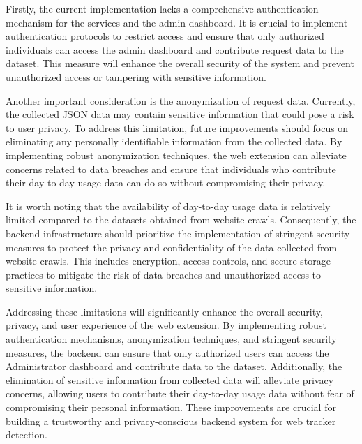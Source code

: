 Firstly, the current implementation lacks a comprehensive authentication mechanism for the services and the admin dashboard.
It is crucial to implement authentication protocols to restrict access and ensure that only authorized individuals can access
the admin dashboard and contribute request data to the dataset. This measure will enhance the overall security of the system
and prevent unauthorized access or tampering with sensitive information.

Another important consideration is the anonymization of request data. Currently, the collected JSON data may contain sensitive
information that could pose a risk to user privacy. To address this limitation, future improvements should focus on eliminating
any personally identifiable information from the collected data. By implementing robust anonymization techniques, the web extension
can alleviate concerns related to data breaches and ensure that individuals who contribute their day-to-day usage data can do so
without compromising their privacy.

It is worth noting that the availability of day-to-day usage data is relatively limited compared to the datasets obtained from website
crawls. Consequently, the backend infrastructure should prioritize the implementation of stringent security measures to protect the
privacy and confidentiality of the data collected from website crawls. This includes encryption, access controls, and secure storage
practices to mitigate the risk of data breaches and unauthorized access to sensitive information.

Addressing these limitations will significantly enhance the overall security, privacy, and user experience of the web extension.
By implementing robust authentication mechanisms, anonymization techniques, and stringent security measures, the backend can ensure
that only authorized users can access the Administrator dashboard and contribute data to the dataset. Additionally, the elimination of sensitive
information from collected data will alleviate privacy concerns, allowing users to contribute their day-to-day usage data without fear
of compromising their personal information. These improvements are crucial for building a trustworthy and privacy-conscious backend
system for web tracker detection.
